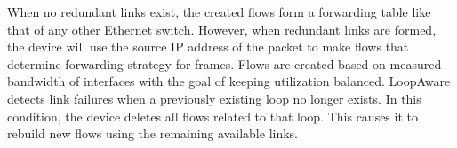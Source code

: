     When no redundant links exist, the created flows form a forwarding table like that of any other Ethernet switch.
    However, when redundant links are formed, the device will use the source IP address of the packet to make flows that determine forwarding strategy for frames.
    Flows are created based on measured bandwidth of interfaces with the goal of keeping utilization balanced.
    LoopAware detects link failures when a previously existing loop no longer exists.
    In this condition, the device deletes all flows related to that loop.
    This causes it to rebuild new flows using the remaining available links.
